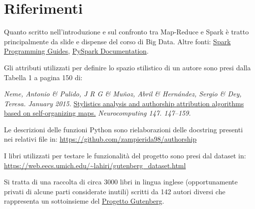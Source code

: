 \documentclass[titlepage]{article}
\begin{document}
\newpage
\section{Riferimenti}
Quanto scritto nell'introduzione e sul confronto tra Map-Reduce e Spark è tratto principalmente da slide e dispense del corso di Big Data. Altre fonti: \href{https://spark.apache.org/docs/latest/}{Spark Programming Guides}, \href{https://spark.apache.org/docs/latest/api/python/index.html}{PySpark Documentation}.
\bigskip

\noindent
Gli attributi utilizzati per definire lo spazio stilistico di un autore sono presi dalla Tabella 1 a pagina 150 di:

\textit{Neme, Antonio \& Pulido, J R G \& Muñoz, Abril \& Hernández, Sergio \& Dey, Teresa. January 2015.} \href{https://www.researchgate.net/publication/265604445_Stylistics_analysis_and_authorship_attribution_algorithms_based_on_self-organizing_maps}{Stylistics analysis and authorship attribution algorithms based on self-organizing maps.} \textit{Neurocomputing 147. 147–159.}
\bigskip

\noindent
Le descrizioni delle funzioni Python sono rielaborazioni delle docstring presenti nei relativi file in: \url{https://github.com/zampierida98/authorship}
\bigskip

\noindent
I libri utilizzati per testare le funzionalità del progetto sono presi dal dataset in: \url{https://web.eecs.umich.edu/~lahiri/gutenberg_dataset.html}

Si tratta di una raccolta di circa 3000 libri in lingua inglese (opportunamente privati di alcune parti considerate inutili) scritti da 142 autori diversi che rappresenta un sottoinsieme del \href{http://www.gutenberg.org/}{Progetto Gutenberg}.
\end{document}
